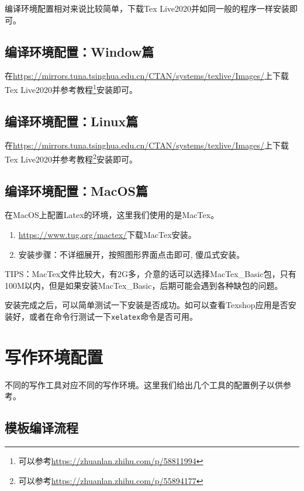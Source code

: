 编译环境配置相对来说比较简单，下载Tex Live2020并如同一般的程序一样安装即可。

\subsection{编译环境配置：Window篇}

在\url{https://mirrors.tuna.tsinghua.edu.cn/CTAN/systems/texlive/Images/}上下载Tex Live2020并参考教程\footnote{可以参考\url{https://zhuanlan.zhihu.com/p/58811994}}安装即可。

\subsection{编译环境配置：Linux篇}

在\url{https://mirrors.tuna.tsinghua.edu.cn/CTAN/systems/texlive/Images/}上下载Tex Live2020并参考教程\footnote{可以参考\url{https://zhuanlan.zhihu.com/p/55894177}}安装即可。


\subsection{编译环境配置：MacOS篇}

在MacOS上配置Latex的环境，这里我们使用的是MacTex。

\begin{enumerate}
    \item \url{https://www.tug.org/mactex/}下载MacTex安装。
    \item 安装步骤：不详细展开，按照图形界面点击即可, 傻瓜式安装。
\end{enumerate}

TIPS：MacTex文件比较大，有2G多，介意的话可以选择MacTex\_Basic包，只有100M以内，但是如果安装MacTex\_Basic，后期可能会遇到各种缺包的问题。


安装完成之后，可以简单测试一下安装是否成功。如可以查看Texshop应用是否安装好，或者在命令行测试一下\texttt{xelatex}命令是否可用。

\section{写作环境配置}

不同的写作工具对应不同的写作环境。这里我们给出几个工具的配置例子以供参考。

\subsection{模板编译流程}

